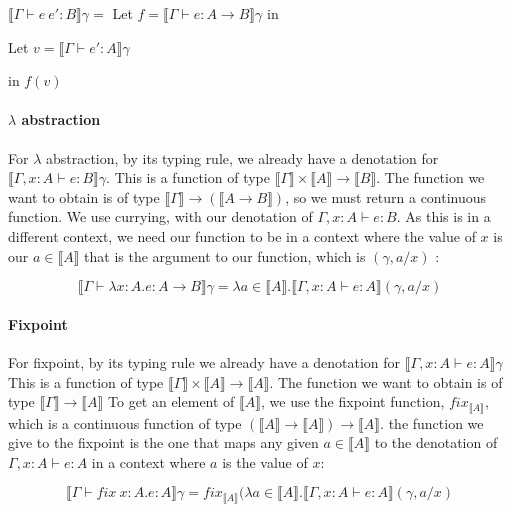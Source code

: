 $\llbracket \Gamma \vdash e \ e' : B \rrbracket \gamma =$ Let $f = \llbracket \Gamma \vdash e : A \to B \rrbracket\gamma$ in 

\hspace{4.5cm} Let $v = \llbracket \Gamma \vdash e' : A \rrbracket\gamma$ 

\hspace{7cm} in $f(v)$

\paragraph{$\lambda$ abstraction} For $\lambda$ abstraction, by its typing rule, we already have a denotation for $\llbracket \Gamma , x : A \vdash e : B \rrbracket \gamma$. This is a function of type $\llbracket \Gamma \rrbracket \times \llbracket A \rrbracket \to \llbracket B \rrbracket$. The function we want to obtain is of type $\llbracket \Gamma \rrbracket \to  (\llbracket A \to  B \rrbracket)$, so we must return a continuous function. We use currying, with our denotation of $\Gamma, x : A \vdash e : B$. As this is in a different context, we need our function to be in a context where the value of $x$ is our $a \in \llbracket A \rrbracket$ that is the argument to our function, which is $(\gamma, a/x)$ :

\[\llbracket \Gamma \vdash \lambda x : A. e : A \to B \rrbracket \gamma = \lambda a \in \llbracket A \rrbracket . \llbracket \Gamma, x : A \vdash e : A \rrbracket(\gamma, a/x)\]
 
\paragraph{Fixpoint} For fixpoint, by its typing rule we already have a denotation for $\llbracket \Gamma , x : A \vdash e : A \rrbracket \gamma$ This is a function of type $\llbracket \Gamma \rrbracket \times \llbracket A \rrbracket \to \llbracket A \rrbracket$. The function we want to obtain is of type $\llbracket \Gamma \rrbracket \to  \llbracket A \rrbracket$ To get an element of $\llbracket A \rrbracket$, we use the fixpoint function, $fix_{\llbracket A \rrbracket}$, which is a continuous function of type $(\llbracket A \rrbracket \to \llbracket A \rrbracket) \to \llbracket A \rrbracket$. the function we give to the fixpoint is the one that maps any given $a \in \llbracket A \rrbracket$ to the denotation of $ \Gamma , x : A \vdash e : A$ in a context where $a$ is the value of $x$:

\[\llbracket \Gamma \vdash fix \ x : A. e : A \rrbracket \gamma =fix_{\llbracket A \rrbracket} (\lambda a \in \llbracket A \rrbracket . \llbracket \Gamma, x : A \vdash e : A \rrbracket(\gamma, a/x)\] 

